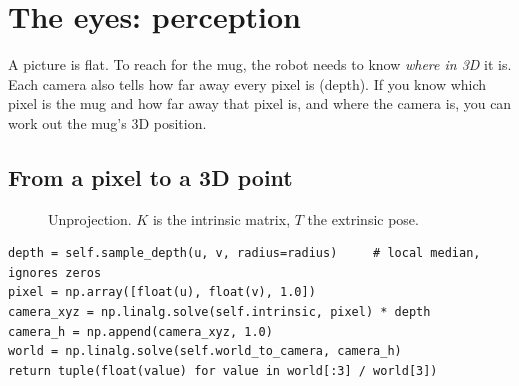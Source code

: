 \documentclass[11pt,a4paper]{article}
\newcommand{\code}[1]{\texttt{\detokenize{#1}}}
\newcommand{\srcref}[1]{{\small\color{stone}\faCode\ \texttt{\detokenize{#1}}}}
\begin{document}
\section{The eyes: perception}

\begin{eli5}
A picture is flat. To reach for the mug, the robot needs to know \emph{where in 3D} it is. Each
camera also tells how far away every pixel is (depth). If you know which pixel is the mug and how far
away that pixel is, and where the camera is, you can work out the mug's 3D position.
\end{eli5}

\subsection{From a pixel to a 3D point}
\begin{figure}[H]
\centering
{}
\caption{Unprojection. $K$ is the intrinsic matrix, $T$ the extrinsic pose.}
\end{figure}

\begin{lstlisting}[numbers=none,caption={\srcref{harness/perception/rgbd.py:97} \ \code{RGBDCamera.unproject} (abridged)}]
depth = self.sample_depth(u, v, radius=radius)     # local median, ignores zeros
pixel = np.array([float(u), float(v), 1.0])
camera_xyz = np.linalg.solve(self.intrinsic, pixel) * depth
camera_h = np.append(camera_xyz, 1.0)
world = np.linalg.solve(self.world_to_camera, camera_h)
return tuple(float(value) for value in world[:3] / world[3])
\end{lstlisting}
\end{document}
